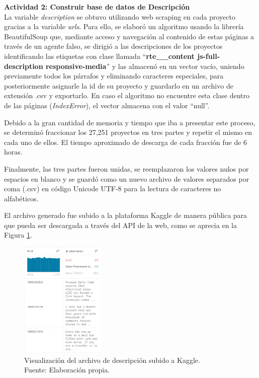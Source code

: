 \newpage
\textbf{Actividad 2: Construir base de datos de Descripción}
\\
La variable \textit{description} se obtuvo utilizando web scraping en cada proyecto gracias a la variable \textit{urls}. Para ello, se elaboró un algoritmo usando la librería BeautifulSoup que, mediante acceso y navegación al contenido de estas páginas a través de un agente falso, se dirigió a las descripciones de los proyectos identificando las etiquetas con clase llamada “\textbf{rte\_\_content js-full-description responsive-media}” y las almacenó en un vector vacío, uniendo previamente todos los párrafos y eliminando caracteres especiales, para posteriormente asignarle la id de su proyecto y guardarlo en un archivo de extensión .csv y exportarlo. En caso el algoritmo no encuentre esta clase dentro de las páginas (\textit{IndexError}), el vector almacena con el valor “null”.

Debido a la gran cantidad de memoria y tiempo que iba a presentar este proceso, se determinó fraccionar los 27,251 proyectos en tres partes y repetir el mismo en cada uno de ellos. El tiempo aproximado de descarga de cada fracción fue de 6 horas.

Finalmente, las tres partes fueron unidas, se reemplazaron los valores nulos por espacios en blanco y se guardó como un nuevo archivo de valores separados por coma (.csv) en código Unicode UTF-8 para la lectura de caracteres no alfabéticos.

El archivo generado fue subido a la plataforma Kaggle de manera pública para que pueda ser descargada a través del API de la web, como se aprecia en la Figura \ref{4:fig5}.

\begin{figure}[!ht]
	\begin{center}
		\includegraphics[width=0.36\textwidth]{4/figures/description_kaggle_preview.jpg}
		\caption[Visualización del archivo de descripción subido a Kaggle]{Visualización del archivo de descripción subido a Kaggle.\\
			Fuente: Elaboración propia.}
		\label{4:fig5}
	\end{center}
\end{figure}

